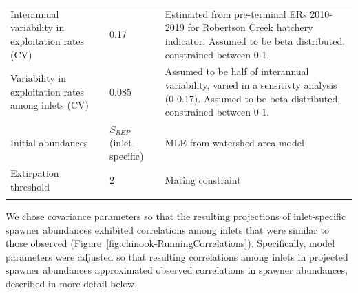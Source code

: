 \documentclass[11pt]{book}
\begin{document}
\begin{longtable}[]{p{3.7cm} p{5cm} p{6.3cm}}
Interannual variability in exploitation rates (CV) & 0.17 & Estimated from pre-terminal ERs 2010-2019 for Robertson Creek hatchery indicator. Assumed to be beta distributed, constrained between 0-1.\\

Variability in exploitation rates among inlets (CV) & 0.085 &  Assumed to be half of interannual variability, varied in a sensitivty analysis (0-0.17). Assumed to be beta distributed, constrained between 0-1.\\

Initial abundances  &  $S_{REP}$ (inlet-specific) & MLE from watershed-area model\\

Extirpation threshold &  2 & Mating constraint \\
\hline
\label{tab:chinook-BaseCasePars}
\end{longtable}
We chose covariance parameters so that the resulting projections of inlet-specific spawner abundances exhibited correlations among inlets that were similar to those observed (Figure~\ref{fig:chinook-RunningCorrelations}). Specifically, model parameters were adjusted so that resulting correlations among inlets in projected spawner abundances approximated observed correlations in spawner abundances, described in more detail below.
\end{document}
